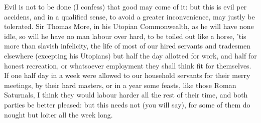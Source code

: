 {Evil is not to be done (I confess) that good may come of it: but this
is evil per accidens, and in a qualified sense, to avoid a greater
inconvenience, may justly be tolerated. Sir Thomas More, in his Utopian
Commonwealth, as he will have none idle, so will he have no man
labour over hard, to be toiled out like a horse, 'tis more than slavish
infelicity, the life of most of our hired servants and tradesmen
elsewhere (excepting his Utopians) but half the day allotted for work,
and half for honest recreation, or whatsoever employment they shall
think fit for themselves. If one half day in a week were allowed to our
household servants for their merry meetings, by their hard masters, or
in a year some feasts, like those Roman Saturnals, I think they would
labour harder all the rest of their time, and both parties be better
pleased: but this needs not (you will say), for some of them do nought
but loiter all the week long.

}
